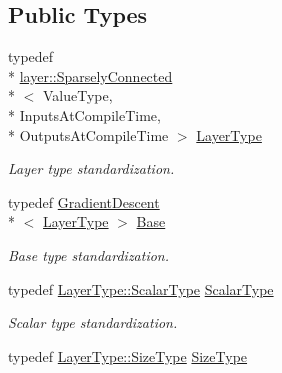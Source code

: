 \subsection*{Public Types}
\begin{DoxyCompactItemize}
\item 
typedef \\*
\hyperlink{classffnn_1_1layer_1_1_sparsely_connected}{layer\-::\-Sparsely\-Connected}\\*
$<$ Value\-Type, \\*
Inputs\-At\-Compile\-Time, \\*
Outputs\-At\-Compile\-Time $>$ \hyperlink{classffnn_1_1optimizer_1_1_adam_3_01layer_1_1_sparsely_connected_3_01_value_type_00_01_inputs_at5101e46d32858ec2169acdeede08d723_af2f04c26de6845836cd595df5caaeaf9}{Layer\-Type}
\begin{DoxyCompactList}\small\item\em Layer type standardization. \end{DoxyCompactList}\item 
typedef \hyperlink{classffnn_1_1optimizer_1_1_gradient_descent}{Gradient\-Descent}\\*
$<$ \hyperlink{classffnn_1_1optimizer_1_1_adam_3_01layer_1_1_sparsely_connected_3_01_value_type_00_01_inputs_at5101e46d32858ec2169acdeede08d723_af2f04c26de6845836cd595df5caaeaf9}{Layer\-Type} $>$ \hyperlink{classffnn_1_1optimizer_1_1_adam_3_01layer_1_1_sparsely_connected_3_01_value_type_00_01_inputs_at5101e46d32858ec2169acdeede08d723_aa291802e48ddc12f1d15293989679f43}{Base}
\begin{DoxyCompactList}\small\item\em Base type standardization. \end{DoxyCompactList}\item 
typedef \hyperlink{classffnn_1_1layer_1_1_sparsely_connected_abe2b75254f39c0bec9f02b2e906e7919}{Layer\-Type\-::\-Scalar\-Type} \hyperlink{classffnn_1_1optimizer_1_1_adam_3_01layer_1_1_sparsely_connected_3_01_value_type_00_01_inputs_at5101e46d32858ec2169acdeede08d723_acbcaaadfd5e5ad46a775e89024f96ec5}{Scalar\-Type}
\begin{DoxyCompactList}\small\item\em Scalar type standardization. \end{DoxyCompactList}\item 
typedef \hyperlink{classffnn_1_1layer_1_1_sparsely_connected_a86b75c2723c1f8b6771224257f5eb1c1}{Layer\-Type\-::\-Size\-Type} \hyperlink{classffnn_1_1optimizer_1_1_adam_3_01layer_1_1_sparsely_connected_3_01_value_type_00_01_inputs_at5101e46d32858ec2169acdeede08d723_a4801eb026ada106bb4134b312e557395}{Size\-Type}

\end{DoxyCompactItemize}
